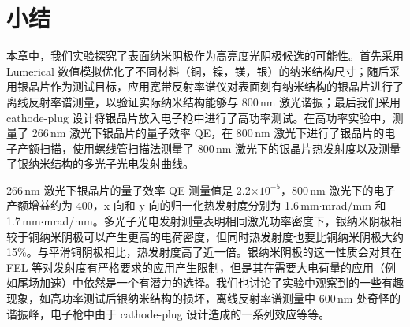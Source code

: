 \section{小结\label{sec:sum}}
本章中，我们实验探究了表面纳米阴极作为高亮度光阴极候选的可能性。首先采用 Lumerical 数值模拟优化了不同材料（铜，镍，镁，银）的纳米结构尺寸；随后采用银晶片作为测试目标，应用宽带反射率谱仪对表面刻有纳米结构的银晶片进行了离线反射率谱测量，以验证实际纳米结构能够与 800\,nm 激光谐振；最后我们采用 cathode-plug 设计将银晶片放入电子枪中进行了高功率测试。在高功率实验中，测量了 266\,nm 激光下银晶片的量子效率 QE，在 800\,nm 激光下进行了银晶片的电子产额扫描，使用螺线管扫描法测量了 800\,nm 激光下的银晶片热发射度以及测量了银纳米结构的多光子光电发射曲线。

266\,nm 激光下银晶片的量子效率 QE 测量值是 2.2$\times10^{-5}$，800\,nm 激光下的电子产额增益约为 400，x 向和 y 向的归一化热发射度分别为 1.6\,mm$\cdot$mrad/mm 和 1.7\,mm$\cdot$mrad/mm。多光子光电发射测量表明相同激光功率密度下，银纳米阴极相较于铜纳米阴极可以产生更高的电荷密度，但同时热发射度也要比铜纳米阴极大约 15\%。与平滑铜阴极相比，热发射度高了近一倍。银纳米阴极的这一性质会对其在 FEL 等对发射度有严格要求的应用产生限制，但是其在需要大电荷量的应用（例如尾场加速）中依然是一个有潜力的选择。我们也讨论了实验中观察到的一些有趣现象，如高功率测试后银纳米结构的损坏，离线反射率谱测量中 600\,nm 处奇怪的谐振峰，电子枪中由于 cathode-plug 设计造成的一系列效应等等。

